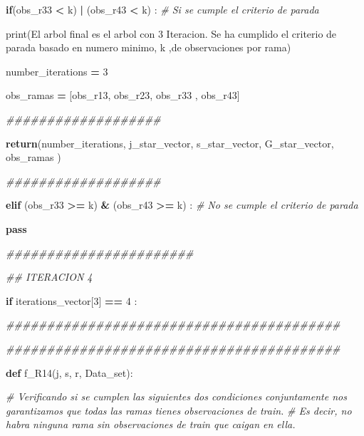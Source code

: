 \documentclass[
  11pt,
  a4paper,
]{article}
\newenvironment{Shaded}{\begin{snugshade}}{\end{snugshade}}
\newcommand{\BuiltInTok}[1]{#1}
\newcommand{\CommentTok}[1]{\textcolor[rgb]{0.56,0.35,0.01}{\textit{#1}}}
\newcommand{\ControlFlowTok}[1]{\textcolor[rgb]{0.13,0.29,0.53}{\textbf{#1}}}
\newcommand{\DecValTok}[1]{\textcolor[rgb]{0.00,0.00,0.81}{#1}}
\newcommand{\KeywordTok}[1]{\textcolor[rgb]{0.13,0.29,0.53}{\textbf{#1}}}
\newcommand{\NormalTok}[1]{#1}
\newcommand{\OperatorTok}[1]{\textcolor[rgb]{0.81,0.36,0.00}{\textbf{#1}}}
\newcommand{\StringTok}[1]{\textcolor[rgb]{0.31,0.60,0.02}{#1}}
\begin{document}
\begin{Shaded}
\begin{Highlighting}[]
        \ControlFlowTok{if}\NormalTok{(obs\_r33 }\OperatorTok{\textless{}}\NormalTok{ k) }\OperatorTok{|}\NormalTok{ (obs\_r43 }\OperatorTok{\textless{}}\NormalTok{ k) : }\CommentTok{\# Si se cumple el criterio de parada}


            \BuiltInTok{print}\NormalTok{(}\StringTok{\textquotesingle{}El arbol final es el arbol con 3 Iteracion. Se ha cumplido el criterio de parada basado en numero minimo\textquotesingle{}}\NormalTok{, k ,}\StringTok{\textquotesingle{}de observaciones por rama\textquotesingle{}}\NormalTok{)}

\NormalTok{            number\_iterations }\OperatorTok{=} \DecValTok{3}
            
\NormalTok{            obs\_ramas }\OperatorTok{=}\NormalTok{ [obs\_r13, obs\_r23, obs\_r33 , obs\_r43]}

            
            \CommentTok{\#\#\#\#\#\#\#\#\#\#\#\#\#\#\#\#\#\#\#}
            
            \ControlFlowTok{return}\NormalTok{(number\_iterations, j\_star\_vector, s\_star\_vector, G\_star\_vector, obs\_ramas ) }

            \CommentTok{\#\#\#\#\#\#\#\#\#\#\#\#\#\#\#\#\#\#\#}


        \ControlFlowTok{elif}\NormalTok{ (obs\_r33 }\OperatorTok{\textgreater{}=}\NormalTok{ k) }\OperatorTok{\&}\NormalTok{ (obs\_r43 }\OperatorTok{\textgreater{}=}\NormalTok{ k) : }\CommentTok{\# No se cumple el criterio de parada}

            \ControlFlowTok{pass}

    \CommentTok{\#\#\#\#\#\#\#\#\#\#\#\#\#\#\#\#\#\#\#\#\#\#\#}


    \CommentTok{\#\# ITERACION 4}

    \ControlFlowTok{if}\NormalTok{ iterations\_vector[}\DecValTok{3}\NormalTok{] }\OperatorTok{==} \DecValTok{4}\NormalTok{ :  }

       \CommentTok{\#\#\#\#\#\#\#\#\#\#\#\#\#\#\#\#\#\#\#\#\#\#\#\#\#\#\#\#\#\#\#\#\#\#\#\#\#\#\#\#\#}

       \CommentTok{\#\#\#\#\#\#\#\#\#\#\#\#\#\#\#\#\#\#\#\#\#\#\#\#\#\#\#\#\#\#\#\#\#\#\#\#\#\#\#\#\#}

        \KeywordTok{def}\NormalTok{ f\_R14(j, s, r, Data\_set):}

           \CommentTok{\# Verificando si se cumplen las siguientes dos condiciones conjuntamente nos garantizamos que todas las ramas tienes observaciones de train. }
           \CommentTok{\# Es decir, no habra ninguna rama sin observaciones de train que caigan en ella.}


\end{Highlighting}
\end{Shaded}
\end{document}
